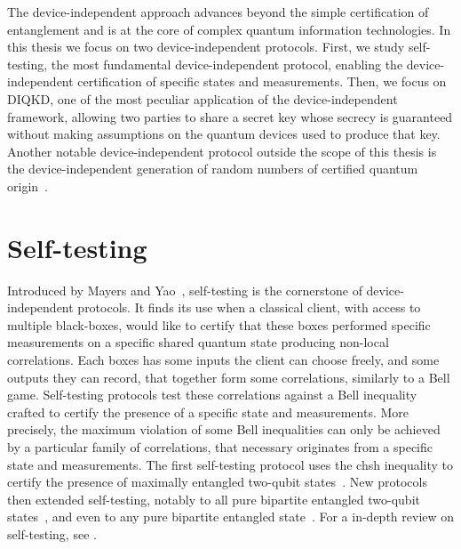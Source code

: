 The device-independent approach advances beyond the simple certification of entanglement and is at the core of complex quantum information technologies.
In this thesis we focus on two device-independent protocols.
First, we study self-testing, the most fundamental device-independent protocol, enabling the device-independent certification of specific states and measurements.
Then, we focus on \acrfull{DIQKD}, one of the most peculiar application of the device-independent framework, allowing two parties to share a secret key whose secrecy is guaranteed without making assumptions on the quantum devices used to produce that key.
Another notable device-independent protocol outside the scope of this thesis is the device-independent generation of random numbers of certified quantum origin~\cite{Acin2016,Liu2018}.


\section{Self-testing}

Introduced by Mayers and Yao~\cite{Mayers2004}, self-testing is the cornerstone of device-independent protocols.
It finds its use when a classical client, with access to multiple black-boxes, would like to certify that these boxes performed specific measurements on a specific shared quantum state producing non-local correlations.
Each boxes has some inputs the client can choose freely, and some outputs they can record, that together form some correlations, similarly to a Bell game.
Self-testing protocols test these correlations against a Bell inequality crafted to certify the presence of a specific state and measurements.
More precisely, the maximum violation of some Bell inequalities can only be achieved by a particular family of correlations, that necessary originates from a specific state and measurements.
The first self-testing protocol uses the \acrshort{chsh} inequality to certify the presence of maximally entangled two-qubit states~\cite{Mayers2004}. 
New protocols then extended self-testing, notably to all pure bipartite entangled two-qubit states~\cite{Yang2013,Bamps2015}, and even to any pure bipartite entangled state~\cite{Coladangelo2017}. 
For a in-depth review on self-testing, see \cite{Supic2019}.

